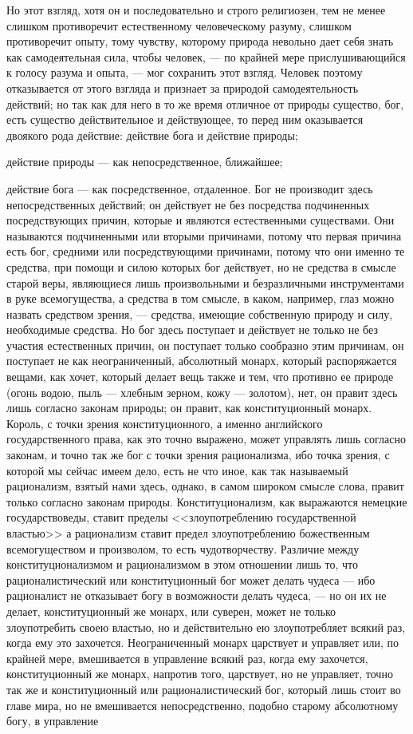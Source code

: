 \documentclass[12pt]{article}
\begin{document}
Но этот взгляд, хотя он и последовательно и строго религиозен, тем не менее слишком противоречит естественному человеческому разуму, слишком противоречит опыту, тому чувству, которому природа невольно дает себя знать как самодеятельная сила, чтобы человек, --- по крайней мере прислушивающийся к голосу разума и опыта, --- мог сохранить этот взгляд. Человек поэтому отказывается от этого взгляда и признает за природой самодеятельность действий; но так как для него в то же время отличное от природы существо, бог, есть существо действительное и действующее, то перед ним оказывается двоякого рода действие: действие бога и действие природы; 

действие природы --- как непосредственное, ближайшее; 

действие бога --- как посредственное, отдаленное. Бог не производит здесь непосредственных действий; он действует не без посредства подчиненных посредствующих причин, которые и являются естественными существами. Они называются подчиненными или вторыми причинами, потому что первая причина есть бог, средними или посредствующими причинами, потому что они именно те средства, при помощи и силою которых бог действует, но не средства в смысле старой веры, являющиеся лишь произвольными и безразличными инструментами в руке всемогущества, а средства в том смысле, в каком, например, глаз можно назвать средством зрения, --- средства, имеющие собственную природу и силу, необходимые средства. Но бог здесь поступает и действует не только не без участия естественных причин, он поступает только сообразно этим причинам, он поступает не как неограниченный, абсолютный монарх, который распоряжается вещами, как хочет, который делает вещь также и тем, что противно ее природе (огонь водою, пыль --- хлебным зерном, кожу --- золотом), нет, он правит здесь лишь согласно законам природы; он правит, как конституционный монарх. Король, с точки зрения конституционного, а именно английского государственного права, как это точно выражено, может управлять лишь согласно законам, и точно так же бог с точки зрения рационализма, ибо точка зрения, с которой мы сейчас имеем дело, есть не что иное, как так называемый рационализм, взятый нами здесь, однако, в самом широком смысле слова, правит только согласно законам природы. Конституционализм, как выражаются немецкие государствоведы, ставит пределы <<злоупотреблению государственной властью>>  а рационализм ставит предел злоупотреблению божественным всемогуществом и произволом, то есть чудотворчеству. Различие между конституционализмом и рационализмом в этом отношении лишь то, что рационалистический или конституционный бог может делать чудеса --- ибо рационалист не отказывает богу в возможности делать чудеса, --- но он их не делает, конституционный же монарх, или суверен, может не только злоупотребить своею властью, но и действительно ею злоупотребляет всякий раз, когда ему это захочется. Неограниченный монарх царствует и управляет или, по крайней мере, вмешивается в управление всякий раз, когда ему захочется, конституционный же монарх, напротив того, царствует, но не управляет, точно так же и конституционный или рационалистический бог, который лишь стоит во главе мира, но не вмешивается непосредственно, подобно старому абсолютному богу, в управление 
\end{document}
